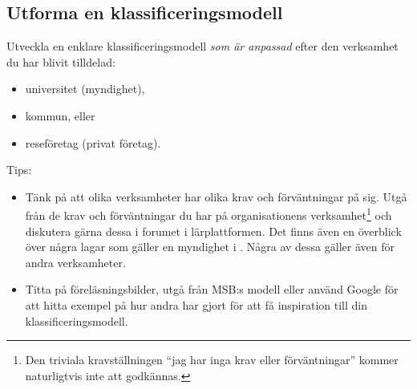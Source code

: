 \documentclass[a4paper]{llncs}
\begin{document}
\subsection{Utforma en klassificeringsmodell}
\label{sec:develop}
\noindent
Utveckla en enklare klassificeringsmodell \emph{som är anpassad} efter den 
verksamhet du har blivit tilldelad:
\begin{itemize}
  \item universitet (myndighet),
  \item kommun, eller
  \item reseföretag (privat företag).
\end{itemize}
\begin{framed}\noindent
  Tips:
  \begin{itemize}
    \item Tänk på att olika verksamheter har olika krav och förväntningar på 
      sig.
      Utgå från de krav och förväntningar du har på organisationens 
      verksamhet\footnote{%
        Den triviala kravställningen \enquote{jag har inga krav eller 
          förväntningar} kommer naturligtvis inte att godkännas.
      } och diskutera gärna dessa i forumet i lärplattformen.
      Det finns även en överblick över några lagar som gäller en myndighet 
      i \citet[bilaga B]{MSB2011v}.
      Några av dessa gäller även för andra verksamheter.
    \item Titta på föreläsningsbilder, utgå från MSB:s modell eller använd 
      Google för att hitta exempel på hur andra har gjort för att få 
      inspiration till din klassificeringsmodell.
  \end{itemize}
\end{framed}
\end{document}
